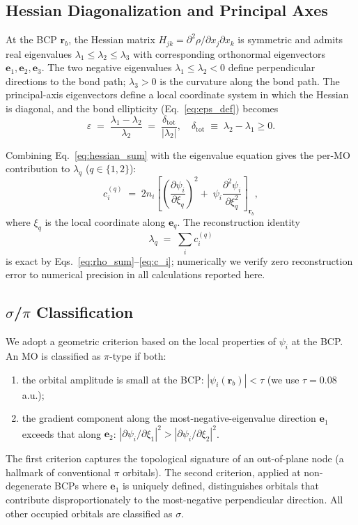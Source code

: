 \documentclass[twoside,natbib]{svjour3}
\newcommand{\eps}{\varepsilon}
\begin{document}
\subsection{Hessian Diagonalization and Principal Axes}

At the BCP $\mathbf{r}_b$, the Hessian matrix
$H_{jk} = \partial^2 \rho / \partial x_j \partial x_k$ is symmetric
and admits real eigenvalues $\lambda_1 \le \lambda_2 \le \lambda_3$
with corresponding orthonormal eigenvectors
$\mathbf{e}_1, \mathbf{e}_2, \mathbf{e}_3$. The two negative
eigenvalues $\lambda_1 \le \lambda_2 < 0$ define perpendicular
directions to the bond path; $\lambda_3 > 0$ is the curvature along
the bond path. The principal-axis eigenvectors define a local
coordinate system in which the Hessian is diagonal, and the bond
ellipticity (Eq.~\ref{eq:eps_def}) becomes
\begin{equation}
\eps \;=\; \frac{\lambda_1 - \lambda_2}{\lambda_2}
       \;=\; \frac{\delta_{\text{tot}}}{|\lambda_2|},
\quad
\delta_{\text{tot}} \;\equiv\; \lambda_2 - \lambda_1 \ge 0.
\label{eq:eps_delta}
\end{equation}

Combining Eq.~\ref{eq:hessian_sum} with the eigenvalue equation gives
the per-MO contribution to $\lambda_q$ ($q \in \{1, 2\}$):
\begin{equation}
c_i^{(q)}
\;=\;
2 n_i \!\left[
   \left(\frac{\partial \psi_i}{\partial \xi_q}\right)^{\!2}
   \!\!\!+\;
   \psi_i \frac{\partial^2 \psi_i}{\partial \xi_q^2}
\right]_{\!\mathbf{r}_b},
\label{eq:c_i}
\end{equation}
where $\xi_q$ is the local coordinate along $\mathbf{e}_q$. The
reconstruction identity
\begin{equation}
\lambda_q \;=\; \sum_{i} c_i^{(q)}
\label{eq:reconstruction}
\end{equation}
is exact by Eqs.~\ref{eq:rho_sum}--\ref{eq:c_i}; numerically we
verify zero reconstruction error to numerical precision in all
calculations reported here.

\subsection{$\sigma$/$\pi$ Classification}

We adopt a geometric criterion based on the local properties of
$\psi_i$ at the BCP. An MO is classified as $\pi$-type if both:
\begin{enumerate}
\item the orbital amplitude is small at the BCP:
$|\psi_i(\mathbf{r}_b)| < \tau$ (we use $\tau = 0.08$ a.u.);
\item the gradient component along the most-negative-eigenvalue
direction $\mathbf{e}_1$ exceeds that along $\mathbf{e}_2$:
$|\partial \psi_i/\partial \xi_1|^2 > |\partial \psi_i/\partial \xi_2|^2$.
\end{enumerate}
The first criterion captures the topological signature of an
out-of-plane node (a hallmark of conventional $\pi$ orbitals). The
second criterion, applied at non-degenerate BCPs where
$\mathbf{e}_1$ is uniquely defined, distinguishes orbitals that
contribute disproportionately to the most-negative perpendicular
direction. All other occupied orbitals are classified as $\sigma$.
\end{document}

